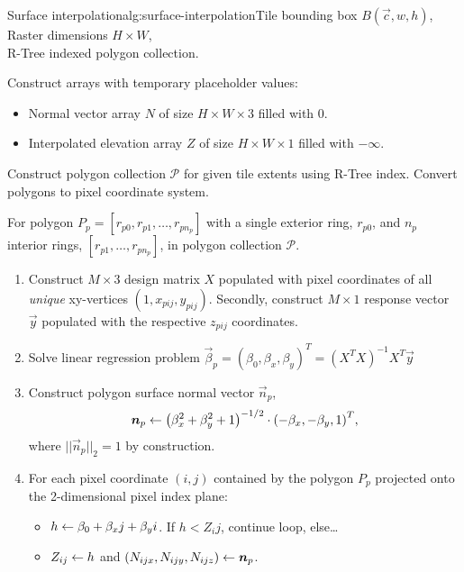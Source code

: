 \begin{algorithm}{Surface interpolation}{alg:surface-interpolation}{Tile bounding box $B(\vec{c}, w, h)$,\\Raster dimensions $H \times W$,\\R-Tree indexed polygon collection.}
\item Construct arrays with temporary placeholder values:
  \begin{itemize}[label=--,leftmargin=0cm]
    \item Normal vector array $N$ of size $H \times W \times 3$ filled with $0$.
    \item Interpolated elevation array $Z$ of size $H \times W \times 1$ filled with $-\infty$.
  \end{itemize}
\item Construct polygon collection $\mathcal{P}$ for given tile extents using R-Tree index.
  Convert polygons to pixel coordinate system.
\item For polygon $P_p = [r_{p0}, r_{p1}, \dots, r_{pn_p}]$ with a single exterior ring, $r_{p0}$, and $n_p$ interior rings, $[r_{p1}, \ldots, r_{pn_p}]$, in polygon collection $\mathcal{P}$.
  \begin{enumerate}[leftmargin=0.5em,label=\textbf{\alph*}]
    \item Construct $M \times 3$ design matrix $X$ populated with pixel coordinates of all \textit{unique} xy-vertices $(1, x_{pij}, y_{pij})$.
        Secondly, construct $M \times 1$ response vector $\vec{y}$ populated with the respective $z_{pij}$ coordinates.
    \item Solve linear regression problem $\vec{\beta}_p = {\left(\beta_0, \beta_x, \beta_y\right)}^T = {\left(X^T X\right)}^{-1} X^T \vec{y}$
    \item Construct polygon surface normal vector $\vec{n}_p$,
      \begin{equation*}
        \boldsymbol{n}_p \leftarrow {\left(\beta_x^2 + \beta_y^2 + 1\right)}^{-1/2} \cdot {\left(-\beta_x, -\beta_y, 1\right)}^T,
      \end{equation*}
      where $||\vec{n}_p||_2 = 1$ by construction.
    \item For each pixel coordinate $(i, j)$ contained by the polygon $P_p$ projected onto the 2-dimensional pixel index plane:
      \begin{itemize}[leftmargin=0.5em]
        \item $h \leftarrow \beta_0 + \beta_x j + \beta_y i$. If $h < Z_ij$, continue loop, else\dots
        \item $Z_{ij} \leftarrow h$ and $\left(N_{ijx}, N_{ijy}, N_{ijz}\right) \leftarrow \boldsymbol{n}_p$.
      \end{itemize}
    \end{enumerate}
\end{algorithm}
